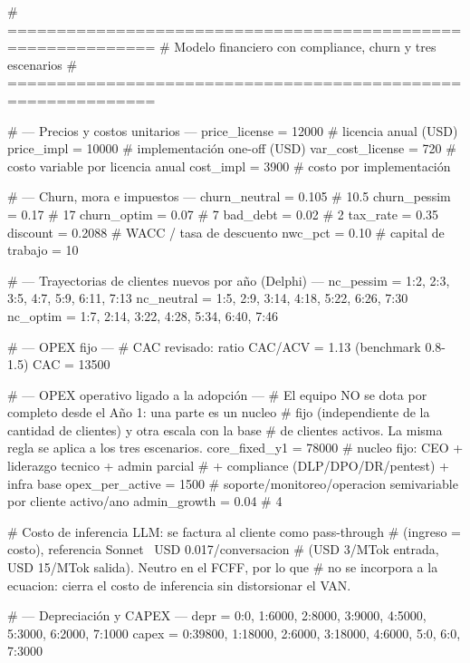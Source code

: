 \begin{APACode}[breaklines=true]
  # =============================================================
  # Modelo financiero con compliance, churn y tres escenarios
  # =============================================================
  
  # --- Precios y costos unitarios ---
  price_license    = 12000   # licencia anual (USD)
  price_impl       = 10000   # implementación one-off (USD)
  var_cost_license = 720     # costo variable por licencia anual
  cost_impl        = 3900    # costo por implementación
  
  # --- Churn, mora e impuestos ---
  churn_neutral = 0.105      # 10.5 %
  churn_pessim  = 0.17       # 17 %
  churn_optim   = 0.07       # 7 %
  bad_debt      = 0.02       # 2 %
  tax_rate      = 0.35
  discount      = 0.2088     # WACC / tasa de descuento
  nwc_pct       = 0.10       # capital de trabajo = 10 %
  
  # --- Trayectorias de clientes nuevos por año (Delphi) ---
  nc_pessim  = {1:2,  2:3,  3:5,  4:7,  5:9,  6:11, 7:13}
  nc_neutral = {1:5,  2:9,  3:14, 4:18, 5:22, 6:26, 7:30}
  nc_optim   = {1:7,  2:14, 3:22, 4:28, 5:34, 6:40, 7:46}
  
  # --- OPEX fijo ---
  # CAC revisado: ratio CAC/ACV = 1.13 (benchmark 0.8-1.5)
  CAC = 13500
  
  # --- OPEX operativo ligado a la adopción ---
  # El equipo NO se dota por completo desde el Año 1: una parte es un nucleo
  # fijo (independiente de la cantidad de clientes) y otra escala con la base
  # de clientes activos. La misma regla se aplica a los tres escenarios.
  core_fixed_y1   = 78000    # nucleo fijo: CEO + liderazgo tecnico + admin parcial
                             #              + compliance (DLP/DPO/DR/pentest) + infra base
  opex_per_active = 1500     # soporte/monitoreo/operacion semivariable por cliente activo/ano
  admin_growth    = 0.04     # 4 %

  # Costo de inferencia LLM: se factura al cliente como pass-through
  # (ingreso = costo), referencia Sonnet ~USD 0.017/conversacion
  # (USD 3/MTok entrada, USD 15/MTok salida). Neutro en el FCFF, por lo que
  # no se incorpora a la ecuacion: cierra el costo de inferencia sin distorsionar el VAN.
  
  # --- Depreciación y CAPEX ---
  depr  = {0:0, 1:6000, 2:8000, 3:9000, 4:5000, 5:3000, 6:2000, 7:1000}
  capex = {0:39800, 1:18000, 2:6000, 3:18000, 4:6000, 5:0, 6:0, 7:3000}
  

\end{APACode}
